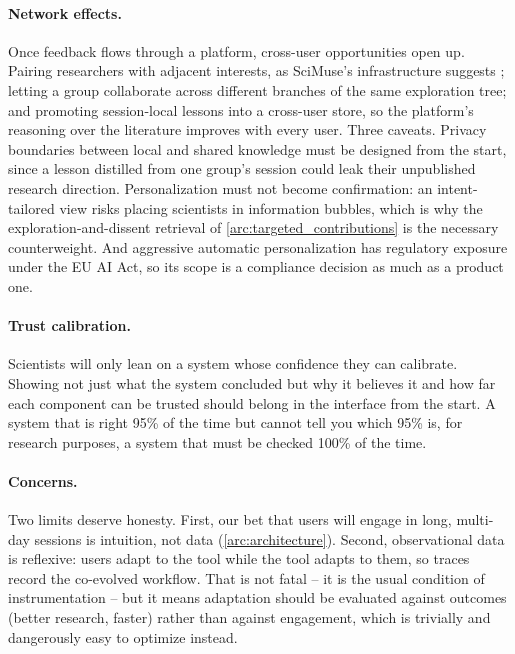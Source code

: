 \paragraph{Network effects.}
Once feedback flows through a platform, cross-user opportunities open up. Pairing researchers with adjacent interests, as SciMuse's infrastructure suggests \cite{2405.17044}; letting a group collaborate across different branches of the same exploration tree; and promoting session-local lessons into a cross-user store, so the platform's reasoning over the literature improves with every user. Three caveats. Privacy boundaries between local and shared knowledge must be designed from the start, since a lesson distilled from one group's session could leak their unpublished research direction. Personalization must not become confirmation: an intent-tailored view risks placing scientists in information bubbles, which is why the exploration-and-dissent retrieval of \ref{arc:targeted_contributions} is the necessary counterweight. And aggressive automatic personalization has regulatory exposure under the EU AI Act, so its scope is a compliance decision as much as a product one.

\paragraph{Trust calibration.}
Scientists will only lean on a system whose confidence they can calibrate. Showing not just what the system concluded but why it believes it and how far each component can be trusted should belong in the interface from the start. A system that is right 95\% of the time but cannot tell you which 95\% is, for research purposes, a system that must be checked 100\% of the time.

\paragraph{Concerns.}
Two limits deserve honesty. First, our bet that users will engage in long, multi-day sessions is intuition, not data (\ref{arc:architecture}). Second, observational data is reflexive: users adapt to the tool while the tool adapts to them, so traces record the co-evolved workflow. That is not fatal -- it is the usual condition of instrumentation -- but it means adaptation should be evaluated against outcomes (better research, faster) rather than against engagement, which is trivially and dangerously easy to optimize instead.

